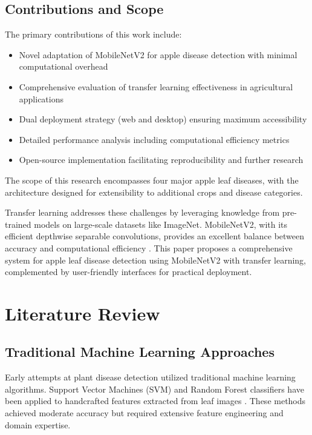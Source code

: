 \documentclass[conference,10pt,letterpaper]{IEEEtran}
\begin{document}
\subsection{Contributions and Scope}

The primary contributions of this work include:
\begin{itemize}
\item Novel adaptation of MobileNetV2 for apple disease detection with minimal computational overhead
\item Comprehensive evaluation of transfer learning effectiveness in agricultural applications
\item Dual deployment strategy (web and desktop) ensuring maximum accessibility
\item Detailed performance analysis including computational efficiency metrics
\item Open-source implementation facilitating reproducibility and further research
\end{itemize}

The scope of this research encompasses four major apple leaf diseases, with the architecture designed for extensibility to additional crops and disease categories.

Transfer learning addresses these challenges by leveraging knowledge from pre-trained models on large-scale datasets like ImageNet. MobileNetV2, with its efficient depthwise separable convolutions, provides an excellent balance between accuracy and computational efficiency \cite{ref3}. This paper proposes a comprehensive system for apple leaf disease detection using MobileNetV2 with transfer learning, complemented by user-friendly interfaces for practical deployment.

\section{Literature Review}

\subsection{Traditional Machine Learning Approaches}

Early attempts at plant disease detection utilized traditional machine learning algorithms. Support Vector Machines (SVM) and Random Forest classifiers have been applied to handcrafted features extracted from leaf images \cite{ref4}. These methods achieved moderate accuracy but required extensive feature engineering and domain expertise.
\end{document}
